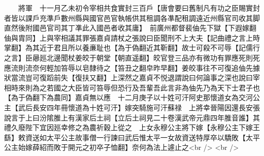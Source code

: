 　　將軍　十一月乙未初令宰相共食實封三百戶【唐會要曰舊制凡有功之臣賜實封者皆以課戶充準戶數州縣與國官邑官執帳供其租調各凖配租調遠近州縣官司收其脚直然後附國邑官司其丁凖此入國邑者收其庸】　前廣州都督裴伷先下獄【下遐嫁翻伷與胄同】上與宰相議其罪張嘉貞請杖之張說曰臣聞刑不上大夫【記曲禮之言上時掌翻】為其近于君且所以養亷耻也【為于偽翻近其靳翻】故士可殺不可辱【記儒行之言】臣曏廵北邊聞杖姜皎于朝堂【朝直遥翻】皎官登三品亦有微功有罪應死則死應流則流奈何輕加笞辱以皂隸待之【笞丑之翻皁昨早翻】姜皎事往不可復追伷先據狀當流豈可復蹈前失【復扶又翻】上深然之嘉貞不悦退謂說曰何論事之深也說曰宰相時來則為之若國之大臣皆可笞辱但恐行及吾輩吾此言非為伷先乃為天下士君子也【為于偽翻下為農同】嘉貞無以應　十二月庚子以十姓可汗阿史那懷道女為交河公主【武后長安四年冊懷道為十姓可汗】嫁突騎施可汗蘇禄　上將幸晉陽因還長安張說言于上曰汾隂脽上有漢家后土祠【立后土祠見二十卷漢武帝元鼎四年脽音誰】其禮久廢陛下宜因廵幸修之為農祈穀上從之　上女永穆公主將下嫁【永穆公主下嫁王繇】敕資送如太平公主故事僧一行諫曰武后惟太平一女故資送特厚卒以驕敗【太平公主始嫁薛紹而敗于開元之初卒子恤翻】奈何為法上遽止之<br />
<br />
